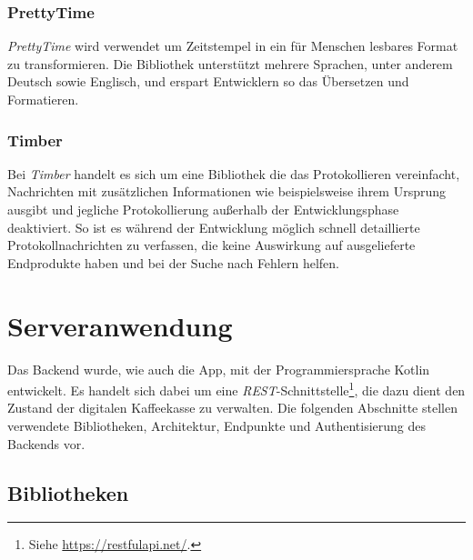 \documentclass[a4paper, 11pt]{article}
\begin{document}
\subsubsection{PrettyTime}
\label{subsubsec:app:bibs:prettytime}

\textit{PrettyTime} wird verwendet um Zeitstempel in ein für Menschen lesbares Format zu transformieren.
Die Bibliothek unterstützt mehrere Sprachen, unter anderem Deutsch sowie Englisch, und erspart Entwicklern so das Übersetzen und Formatieren.

\subsubsection{Timber}
\label{subsubsec:app:bibs:timber}

Bei \textit{Timber} handelt es sich um eine Bibliothek die das Protokollieren vereinfacht, Nachrichten mit zusätzlichen Informationen wie beispielsweise ihrem Ursprung ausgibt und jegliche Protokollierung außerhalb der Entwicklungsphase deaktiviert.
So ist es während der Entwicklung möglich schnell detaillierte Protokollnachrichten zu verfassen, die keine Auswirkung auf ausgelieferte Endprodukte haben und bei der Suche nach Fehlern helfen.

\section{Serveranwendung}
\label{sec:backend}

Das Backend wurde, wie auch die App, mit der Programmiersprache Kotlin entwickelt.
Es handelt sich dabei um eine \textit{REST}-Schnittstelle\footnote{Siehe \url{https://restfulapi.net/}.}, die dazu dient den Zustand der digitalen Kaffeekasse zu verwalten.
Die folgenden Abschnitte stellen verwendete Bibliotheken, Architektur, Endpunkte und Authentisierung des Backends vor.

\subsection{Bibliotheken}
\label{subsec:backend:bibs}
\end{document}
